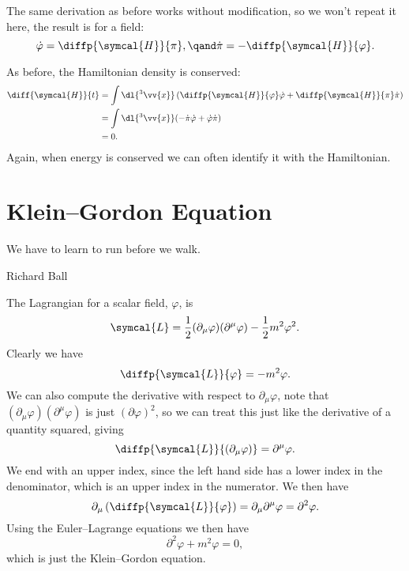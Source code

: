 \documentclass[fleqn]{NotesClass}
\newcommand{\dalembertian}{\partial^2}
\newcommand{\lagrangianDensity}{\symcal{L}}
\newcommand{\hamiltonianDensity}{\symcal{H}}
\begin{document}
    The same derivation as before works without modification, so we won't repeat it here, the result is  for a field:
    \begin{equation}
        \dot{\varphi} = \diffp{\hamiltonianDensity}{\pi}, \qand \dot{\pi} = - \diffp{\hamiltonianDensity}{\varphi}.
    \end{equation}
    
    As before, the Hamiltonian density is conserved:
    \begin{align}
        \diff{\hamiltonianDensity}{t} &= \int \dl{^3\vv{x}} \left( \diffp{\hamiltonianDensity}{\varphi} \dot{\varphi} + \diffp{\hamiltonianDensity}{\pi} \dot{\pi} \right)\\
        &= \int \dl{^3\vv{x}} (-\dot{\pi} \dot{\varphi} + \dot{\varphi} \dot{\pi})\\
        &= 0.
    \end{align}
    Again, when energy is conserved we can often identify it with the Hamiltonian.
    
    \section{Klein--Gordon Equation}
    \epigraph{We have to learn to run before we walk.}{Richard Ball}
    The Lagrangian for a scalar field, \(\varphi\), is
    \begin{equation}
        \lagrangianDensity = \frac{1}{2}(\partial_\mu \varphi)(\partial^\mu \varphi) - \frac{1}{2}m^2\varphi^2.
    \end{equation}
    Clearly we have
    \begin{equation}
        \diffp{\lagrangianDensity}{\varphi} = -m^2\varphi.
    \end{equation}
    We can also compute the derivative with respect to \(\partial_\mu \varphi\), note that \((\partial_\mu \varphi)(\partial^\mu \varphi)\) is just \((\partial \varphi)^2\), so we can treat this just like the derivative of a quantity squared, giving
    \begin{equation}
        \diffp{\lagrangianDensity}{(\partial_\mu \varphi)} = \partial^\mu \varphi.
    \end{equation}
    We end with an upper index, since the left hand side has a lower index in the denominator, which is an upper index in the numerator.
    We then have
    \begin{equation}
        \partial_\mu \left( \diffp{\lagrangianDensity}{\varphi} \right) = \partial_\mu \partial^\mu \varphi = \dalembertian \varphi.
    \end{equation}
    Using the Euler--Lagrange equations we then have
    \begin{equation}
        \dalembertian \varphi + m^2 \varphi = 0,
    \end{equation}
    which is just the Klein--Gordon equation.
    
\end{document}
